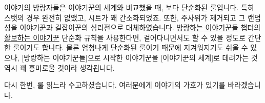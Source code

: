 \documentclass{report}
\begin{document}
	이야기의 방랑자들은 이야기꾼의 세계와 비교했을 때, 보다 단순화된 룰입니다. 특히 스탯의 경우 완전히 없앴고, 시트가 꽤 간소화되었죠. 또한, 주사위가 제거되고 그 랜덤성을 이야기꾼과 길잡이꾼의 심리전으로 대체하였습니다. \hyperlink{wandering-storytellers}{방랑하는 이야기꾼들} 챕터의 \hyperlink{walking-storytellers}{활보하는 이야기꾼} 단순화 규칙을 사용한다면, 걸어다니면서도 할 수 있을 정도로 간단한 룰이기도 합니다. 물론 엄청나게 단순화된 룰이기 때문에 지겨워지기도 쉬울 수 있으나, [방랑하는 이야기꾼들]으로 시작한 이야기꾼을 [이야기꾼의 세계]로 데려가는 것 역시 꽤 흥미로울 것이라 생각됩니다.
	
	다시 한번, 룰 읽느라 수고하셨습니다. 여러분에게 이야기의 가호가 있기를 바라겠습니다.
\end{document}
